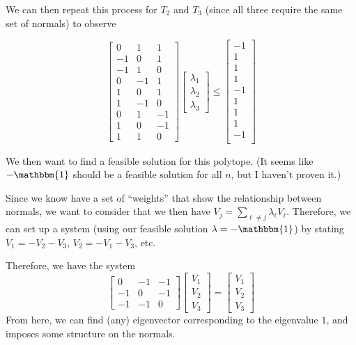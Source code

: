 \documentclass[12pt]{article}
\newcommand{\ones}{\mathbbm{1}}
\begin{document}
  We can then repeat this process for $T_2$ and $T_3$ (since all three require the same set of normals) to observe
  
    \[
    \begin{bmatrix}
        0 & 1 & 1      \\
        -1 & 0 & 1 \\
        -1 & 1 & 0 \\ \hline
        0 & -1 & 1\\
        1 & 0 & 1\\
        1 & -1 & 0\\ \hline
        0 & 1 & -1\\
        1 & 0 &-1 \\
        1 & 1 & 0     
    \end{bmatrix}
    \begin{bmatrix}
        \lambda_1\\
        \lambda_2\\
        \lambda_3
    \end{bmatrix}
    \leq 
    \begin{bmatrix}
        -1\\
        1 \\
        1 \\ \hline
        1 \\
        -1 \\
        1\\ \hline
        1\\
        1\\
        -1\\
    \end{bmatrix} 
    \]
    
    We then want to find a feasible solution for this polytope.
    (It seems like $-\ones$ should be a feasible solution for all $n$, but I haven't proven it.)
    
    Since we know have a set of ``weights'' that show the relationship between normals, we want to consider that we then have $V_j = \sum_{\ell \neq j}\lambda_\ell V_\ell.$
    Therefore, we can set up a system (using our feasible solution $\lambda = -\ones$) by stating $V_1 = -V_2 - V_3$, $V_2 = -V_1 - V_3$, etc.
    
    Therefore, we have the system
    \[
    \begin{bmatrix}
        0 & -1 & -1\\
        -1 & 0 & -1 \\
        -1 & -1 & 0
    \end{bmatrix}
    \begin{bmatrix}
        V_1\\
        V_2\\
        V_3
    \end{bmatrix}
    =
    \begin{bmatrix}
        V_1\\
        V_2 \\
        V_3 
    \end{bmatrix} 
    \]
    From here, we can find (any) eigenvector corresponding to the eigenvalue $1$, and imposes some structure on the normals.
    
\end{document}
